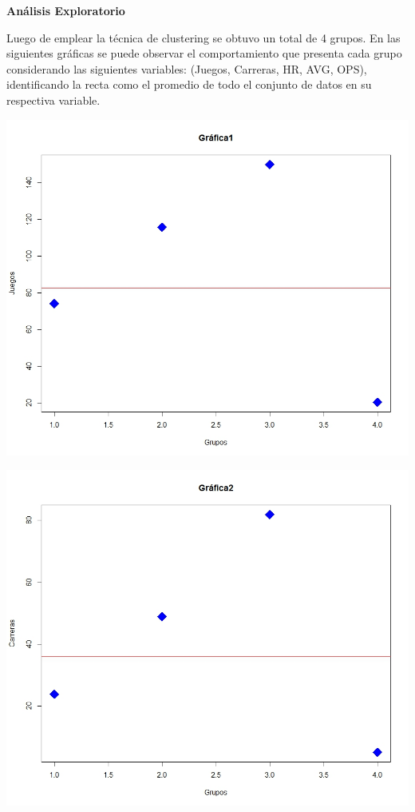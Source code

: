 \documentclass[11pt,letterpaper]{report}
\begin{document}
\begin{center}
	\textbf{\large Análisis Exploratorio}
\end{center} 
    
   Luego de emplear la técnica de clustering se obtuvo un total de 4 grupos. 
   En las siguientes gráficas se puede observar el comportamiento que presenta cada grupo considerando las siguientes variables: (Juegos, Carreras, HR, AVG, OPS), identificando la recta como el promedio de todo el conjunto de datos en su respectiva variable.
   
    \begin{center}
    	\includegraphics[scale=0.4]{Grafica1.jpeg} \\ \vspace{1.5cm}
    	
    	\includegraphics[scale=0.4]{Grafica2.jpeg} \vspace{1.5cm}
    	

\end{center}
\end{document}

